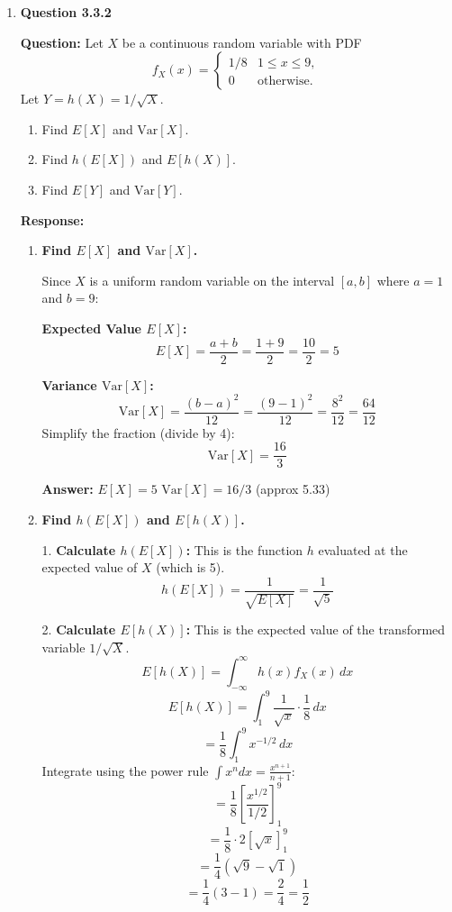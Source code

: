 \documentclass[12pt]{article}
\begin{document}
\begin{enumerate}[label=\textbf{\arabic*.}, leftmargin=*]
\begin{enumerate}[label=(\alph*)]
    \textbf{Answer:}
    $E[Y] = 7/3$
    $\text{Var}[Y] = 304/45$ (approx 6.756)
\end{enumerate}

\newpage
\item \textbf{Question 3.3.2}

\textbf{Question:} Let $X$ be a continuous random variable with PDF
\[
f_X (x) = \begin{cases}
1/8 & 1 \le x \le 9, \\
0 & \text{otherwise.}
\end{cases}
\]
Let $Y = h(X) = 1/\sqrt{X}$.
\begin{enumerate}[label=(\alph*)]
    \item Find $E[X]$ and $\text{Var}[X]$.
    \item Find $h(E[X])$ and $E[h(X)]$.
    \item Find $E[Y]$ and $\text{Var}[Y]$.
\end{enumerate}

\vspace{0.3in}

\textbf{Response:}

\begin{enumerate}[label=(\alph*)]
    \item \textbf{Find $E[X]$ and $\text{Var}[X]$.}

    Since $X$ is a uniform random variable on the interval $[a, b]$ where $a = 1$ and $b = 9$:

    \textbf{Expected Value $E[X]$:}
    \[ E[X] = \frac{a + b}{2} = \frac{1 + 9}{2} = \frac{10}{2} = 5 \]

    \textbf{Variance $\text{Var}[X]$:}
    \[ \text{Var}[X] = \frac{(b - a)^2}{12} = \frac{(9 - 1)^2}{12} = \frac{8^2}{12} = \frac{64}{12} \]
    Simplify the fraction (divide by 4):
    \[ \text{Var}[X] = \frac{16}{3} \]

    \textbf{Answer:}
    $E[X] = 5$
    $\text{Var}[X] = 16/3$ (approx 5.33)

    \item \textbf{Find $h(E[X])$ and $E[h(X)]$.}

    1. \textbf{Calculate $h(E[X])$:}
    This is the function $h$ evaluated at the expected value of $X$ (which is 5).
    \[ h(E[X]) = \frac{1}{\sqrt{E[X]}} = \frac{1}{\sqrt{5}} \]

    2. \textbf{Calculate $E[h(X)]$:}
    This is the expected value of the transformed variable $1/\sqrt{X}$.
    \[ E[h(X)] = \int_{-\infty}^{\infty} h(x) f_X(x) \, dx \]
    \[ E[h(X)] = \int_{1}^{9} \frac{1}{\sqrt{x}} \cdot \frac{1}{8} \, dx \]
    \[ = \frac{1}{8} \int_{1}^{9} x^{-1/2} \, dx \]
    Integrate using the power rule $\int x^n dx = \frac{x^{n+1}}{n+1}$:
    \[ = \frac{1}{8} \left[ \frac{x^{1/2}}{1/2} \right]_{1}^{9} \]
    \[ = \frac{1}{8} \cdot 2 \left[ \sqrt{x} \right]_{1}^{9} \]
    \[ = \frac{1}{4} (\sqrt{9} - \sqrt{1}) \]
    \[ = \frac{1}{4} (3 - 1) = \frac{2}{4} = \frac{1}{2} \]


\end{enumerate}
\end{enumerate}
\end{document}
